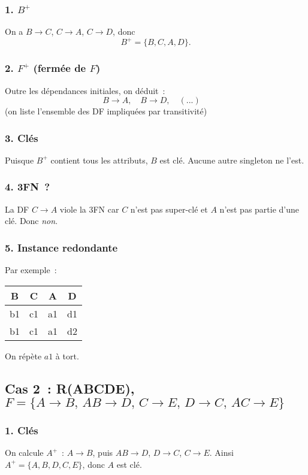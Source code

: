 \documentclass[a4paper,12pt]{article}
\begin{document}
\subsubsection*{1. $B^+$}
On a $B\to C$, $C\to A$, $C\to D$, donc
\[
  B^+ = \{B,C,A,D\}.
\]

\subsubsection*{2. $F^+$ (fermée de $F$)}
Outre les dépendances initiales, on déduit :
\[
  B\to A,
  \quad B\to D,
  \quad (...)\quad
\]
(on liste l'ensemble des DF impliquées par transitivité)

\subsubsection*{3. Clés}
Puisque $B^+$ contient tous les attributs, $B$ est clé. Aucune autre singleton ne l'est.

\subsubsection*{4. 3FN ?}
La DF $C \to A$ viole la 3FN car $C$ n'est pas super-clé et $A$ n'est pas partie d'une clé. Donc \emph{non}.

\subsubsection*{5. Instance redondante}
Par exemple :
\begin{center}
\begin{tabular}{|c|c|c|c|}\hline
B & C & A & D\\\hline
b1 & c1 & a1 & d1\\
b1 & c1 & a1 & d2\\\hline
\end{tabular}
\end{center}
On répète $a1$ à tort.

\subsection*{Cas 2 : R(ABCDE), $F=\{A \to B,\,AB \to D,\,C \to E,\,D \to C,\,AC \to E\}$}

\subsubsection*{1. Clés}
On calcule $A^+$ : $A\to B$, puis $AB\to D$, $D\to C$, $C\to E$. Ainsi $A^+=\{A,B,D,C,E\}$, donc $A$ est clé.
\end{document}
